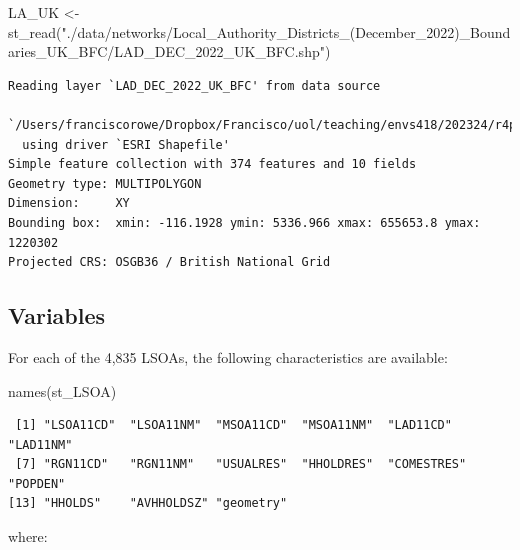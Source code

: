 \documentclass[
  letterpaper,
  DIV=11,
  numbers=noendperiod]{scrreprt}
\newenvironment{Shaded}{\begin{snugshade}}{\end{snugshade}}
\newcommand{\FunctionTok}[1]{\textcolor[rgb]{0.28,0.35,0.67}{#1}}
\newcommand{\NormalTok}[1]{\textcolor[rgb]{0.00,0.23,0.31}{#1}}
\newcommand{\OtherTok}[1]{\textcolor[rgb]{0.00,0.23,0.31}{#1}}
\newcommand{\StringTok}[1]{\textcolor[rgb]{0.13,0.47,0.30}{#1}}
\begin{document}
\begin{Shaded}
\begin{Highlighting}[]
\NormalTok{LA\_UK }\OtherTok{\textless{}{-}} \FunctionTok{st\_read}\NormalTok{(}\StringTok{"./data/networks/Local\_Authority\_Districts\_(December\_2022)\_Boundaries\_UK\_BFC/LAD\_DEC\_2022\_UK\_BFC.shp"}\NormalTok{)}
\end{Highlighting}
\end{Shaded}

\begin{verbatim}
Reading layer `LAD_DEC_2022_UK_BFC' from data source 
  `/Users/franciscorowe/Dropbox/Francisco/uol/teaching/envs418/202324/r4ps/data/networks/Local_Authority_Districts_(December_2022)_Boundaries_UK_BFC/LAD_DEC_2022_UK_BFC.shp' 
  using driver `ESRI Shapefile'
Simple feature collection with 374 features and 10 fields
Geometry type: MULTIPOLYGON
Dimension:     XY
Bounding box:  xmin: -116.1928 ymin: 5336.966 xmax: 655653.8 ymax: 1220302
Projected CRS: OSGB36 / British National Grid
\end{verbatim}

\hypertarget{variables-1}{%
\subsection*{Variables}\label{variables-1}}

For each of the 4,835 LSOAs, the following characteristics are
available:

\begin{Shaded}
\begin{Highlighting}[]
\FunctionTok{names}\NormalTok{(st\_LSOA)}
\end{Highlighting}
\end{Shaded}

\begin{verbatim}
 [1] "LSOA11CD"  "LSOA11NM"  "MSOA11CD"  "MSOA11NM"  "LAD11CD"   "LAD11NM"  
 [7] "RGN11CD"   "RGN11NM"   "USUALRES"  "HHOLDRES"  "COMESTRES" "POPDEN"   
[13] "HHOLDS"    "AVHHOLDSZ" "geometry" 
\end{verbatim}

where:
\end{document}
